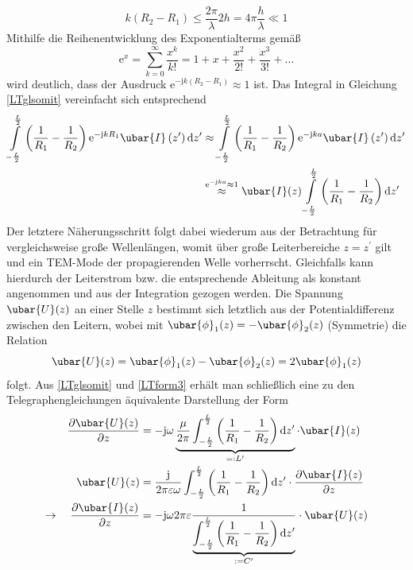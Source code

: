 \begin{equation}
	k\left(R_{2}-R_{1}\right) \leq \frac{2 \pi}{\lambda} 2 h=4 \pi \frac{h}{\lambda} \ll 1 
\end{equation}
Mithilfe die Reihenentwicklung des Exponentialterms gemäß
\begin{equation}
	\mathrm{e}^{x}=\sum_{k=0}^{\infty} \frac{x^{k}}{k!}=1+x+\frac{x^{2}}{2!}+\frac{x^{3}}{3!}+\ldots 
\end{equation}
wird deutlich, dass der Ausdruck $\mathrm{e}^{-\mathrm{j} k\left(R_{2}-R_{1}\right)} \approx 1$ ist. Das Integral in Gleichung \ref{LTglsomit} vereinfacht sich entsprechend
\begin{align}
	\int\limits_{-\frac{L}{2}}^{\frac{L}{2}}\left(\frac{1}{R_{1}}-\frac{1}{R_{2}}\right) \mathrm{e}^{-\mathrm{j} k R_{1}} \ubar{I}\left(z^{\prime}\right) \mathrm{d} z^{\prime} & \approx \int\limits_{-\frac{L}{2}}^{\frac{L}{2}}\left(\frac{1}{R_{1}}-\frac{1}{R_{2}}\right) \mathrm{e}^{-\mathrm{j} k a} \ubar{I}\left(z^{\prime}\right) \mathrm{d} z^{\prime}  \\
	& \stackrel{\mathrm{e}^{-\mathrm{j} k a} \approx 1}{\approx} \ubar{I}(z) \int\limits_{-\frac{L}{2}}^{\frac{L}{2}}\left(\frac{1}{R_{1}}-\frac{1}{R_{2}}\right) \mathrm{d} z^{\prime} 
\end{align}
Der letztere Näherungsschritt folgt dabei wiederum aus der Betrachtung für vergleichsweise große Wellenlängen, womit über große Leiterbereiche $z=z^{\prime}$ gilt und ein TEM-Mode der propagierenden Welle vorherrscht. Gleichfalls kann hierdurch der Leiterstrom bzw. die entsprechende Ableitung als konstant angenommen und aus der Integration gezogen werden. Die Spannung $\ubar{U}(z)$ an einer Stelle $z$ bestimmt sich letztlich aus der Potentialdifferenz zwischen den Leitern, wobei mit $\ubar{\phi}_{1}(z)=-\ubar{\phi}_{2}(z)$ (Symmetrie) die Relation
\begin{equation}
	\ubar{U}(z)=\ubar{\phi}_{1}(z)-\ubar{\phi}_{2}(z)=2 \ubar{\phi}_{1}(z) 
\end{equation}
folgt.
Aus \ref{LTglsomit} und \ref{LTform3} erhält man schließlich eine zu den Telegraphengleichungen äquivalente Darstellung der Form
\begin{align}
	 \frac{\partial \ubar{U}(z)}{\partial z}&=-\mathrm{j} \omega \underbrace{\frac{\mu}{2 \pi} \int_{-\frac{L}{2}}^{\frac{L}{2}}\left(\frac{1}{R_{1}}-\frac{1}{R_{2}}\right) \mathrm{d} z^{\prime} }_{=: L^{\prime}} \cdot \ubar{I}(z)  \\
	 \ubar{U}(z)&=\frac{\mathrm{j}}{2 \pi \varepsilon \omega} \int_{-\frac{L}{2}}^{\frac{L}{2}}\left(\frac{1}{R_{1}}-\frac{1}{R_{2}}\right) \mathrm{d} z^{\prime} \cdot \frac{\partial \ubar{I}(z)}{\partial z}  \\
	\rightarrow \quad \frac{\partial \ubar{I}(z)}{\partial z}&=-\mathrm{j} \omega 2 \pi \varepsilon \frac{1}{\underbrace{\int_{-\frac{L}{2}}^{\frac{L}{2}}\left(\frac{1}{R_{1}}-\frac{1}{R_{2}}\right) \mathrm{d} z^{\prime}}_{:=C^{\prime}}} \cdot \ubar{U}(z) 
\end{align}
